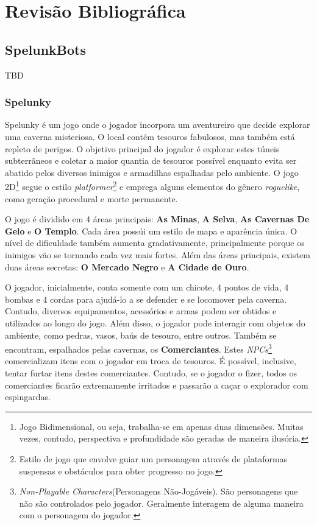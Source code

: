 \chapter{\label{chap:lit-review}Revisão Bibliográfica}

\section{SpelunkBots} TBD

\subsection{Spelunky}
Spelunky \cite{SPELUNKYWEB} é um jogo onde o jogador incorpora um aventureiro
que decide explorar uma caverna misteriosa. O local contém tesouros fabulosos,
mas também está repleto de perigos. O objetivo principal do jogador é explorar
estes túneis subterrâneos e coletar a maior quantia de tesouros possível
enquanto evita ser abatido pelos diversos inimigos e armadilhas espalhadas pelo
ambiente. O jogo 2D\footnote{Jogo Bidimensional, ou seja, trabalha-se em apenas
duas dimensões. Muitas vezes, contudo, perspectiva e profundidade são geradas de
maneira ilusória.} segue o estilo \textit{platformer}\footnote{Estilo de jogo
que envolve guiar um personagem através de plataformas suspensas e obstáculos
para obter progresso no jogo.} e emprega alguns elementos do gênero
\textit{roguelike}, como geração procedural e morte permanente.

O jogo é dividido em 4 áreas principais: \textbf{As Minas}, \textbf{A Selva},
\textbf{As Cavernas De Gelo} e \textbf{O Templo}. Cada área possúi um estilo de
mapa e aparência única. O nível de dificuldade também aumenta gradativamente,
principalmente porque os inimigos vão se tornando cada vez mais fortes. Além das
áreas principais, existem duas áreas secretas: \textbf{O Mercado Negro} e
\textbf{A Cidade de Ouro}.

O jogador, inicialmente, conta somente com um chicote, 4 pontos de vida, 4
bombas e 4 cordas para ajudá-lo a se defender e se locomover pela caverna.
Contudo, diversos equipamentos, acessórios e armas podem ser obtidos e
utilizados ao longo do jogo. Além disso, o jogador pode interagir com objetos do
ambiente, como pedras, vasos, baús de tesouro, entre outros. Também se
encontram, espalhados pelas cavernas, os \textbf{Comerciantes}. Estes
\textit{NPCs}\footnote{\textit{Non-Playable Characters}(Personagens
Não-Jogáveis). São personagens que não são controlados pelo jogador. Geralmente
interagem de alguma maneira com o personagem do jogador.} comercializam itens
com o jogador em troca de tesouros. É possível, inclusive, tentar furtar itens
destes comerciantes. Contudo, se o jogador o fizer, todos os comerciantes
ficarão extremamente irritados e passarão a caçar o explorador com espingardas.

